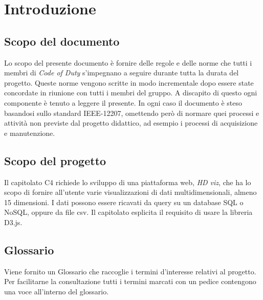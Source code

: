 \section{Introduzione}
    \subsection{Scopo del documento}
    Lo scopo del presente documento è fornire delle regole e delle norme che tutti i membri di \textit{Code of Duty} s'impegnano a seguire durante tutta la durata del progetto. Queste norme vengono scritte in modo incrementale dopo essere state concordate in riunione con tutti i membri del gruppo.
    A discapito di questo ogni componente è tenuto a leggere il presente.
    In ogni caso il documento è steso basandosi sullo standard IEEE-12207, omettendo però di normare quei processi e attività non previste dal progetto didattico, ad esempio i processi di acquisizione e manutenzione. 
    \subsection{Scopo del progetto}
    Il capitolato C4 richiede lo sviluppo di una piattaforma web, \textit{HD viz}, che ha lo scopo di fornire all'utente varie visualizzazioni di dati multidimensionali, almeno 15 dimensioni. I dati possono essere ricavati da query su un database SQL o NoSQL, oppure da file csv. Il capitolato esplicita il requisito di usare la libreria D3.js.
    \subsection{Glossario}
    Viene fornito un Glossario che raccoglie i termini d'interesse relativi al progetto. Per facilitarne la consultazione tutti i termini marcati con un pedice \glo{} contengono una voce all'interno del glossario.
